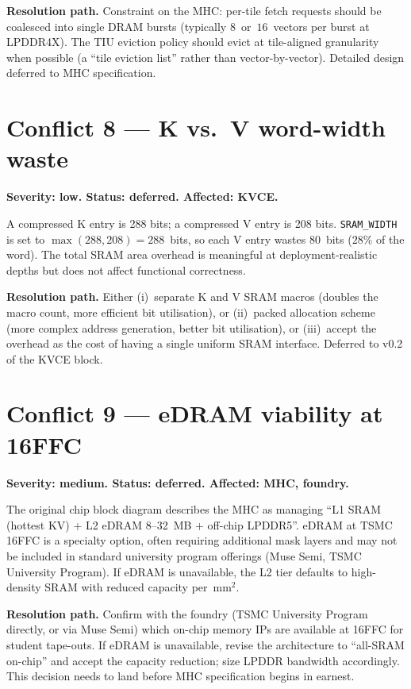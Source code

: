\documentclass[11pt]{article}
\begin{document}
\textbf{Resolution path.} Constraint on the MHC: per-tile fetch
requests should be coalesced into single DRAM bursts (typically
$8$~or~$16$~vectors per burst at LPDDR4X). The TIU eviction policy
should evict at tile-aligned granularity when possible (a ``tile
eviction list'' rather than vector-by-vector). Detailed design
deferred to MHC specification.

\section{Conflict 8 --- K vs.\ V word-width waste}
\label{sec:c8}

\textbf{Severity: low. Status: deferred. Affected: KVCE.}

A compressed K entry is 288 bits; a compressed V entry is 208 bits.
\texttt{SRAM\_WIDTH} is set to $\max(288, 208) = 288$~bits, so each
V entry wastes 80~bits ($28\%$ of the word). The total SRAM area
overhead is meaningful at deployment-realistic depths but does not
affect functional correctness.

\textbf{Resolution path.} Either (i)~separate K and V SRAM macros
(doubles the macro count, more efficient bit utilisation), or
(ii)~packed allocation scheme (more complex address generation,
better bit utilisation), or (iii)~accept the overhead as the cost
of having a single uniform SRAM interface. Deferred to v0.2 of the
KVCE block.

\section{Conflict 9 --- eDRAM viability at 16FFC}
\label{sec:c9}

\textbf{Severity: medium. Status: deferred. Affected: MHC, foundry.}

The original chip block diagram describes the MHC as managing
``L1 SRAM (hottest KV) + L2 eDRAM 8--32~MB + off-chip LPDDR5''.
eDRAM at TSMC 16FFC is a specialty option, often requiring
additional mask layers and may not be included in standard university
program offerings (Muse Semi, TSMC University Program). If eDRAM is
unavailable, the L2 tier defaults to high-density SRAM with reduced
capacity per~mm$^2$.

\textbf{Resolution path.} Confirm with the foundry (TSMC University
Program directly, or via Muse Semi) which on-chip memory IPs are
available at 16FFC for student tape-outs. If eDRAM is unavailable,
revise the architecture to ``all-SRAM on-chip'' and accept the
capacity reduction; size LPDDR bandwidth accordingly. This decision
needs to land before MHC specification begins in earnest.
\end{document}
